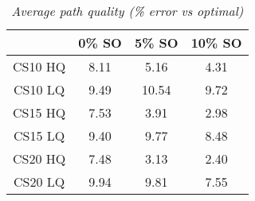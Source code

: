 \begin{table}[ht]
\begin{center}
\caption{\small{\emph{Average path quality (\% error vs optimal)}}}
\label{aha-table:pathquality}
\begin{tabular*}{0.4\textwidth}{@{\extracolsep{\fill}}cccc}%
  \hline
 & \small{0\% SO} & \small{5\% SO} & \small{10\% SO} \\
  \hline
 \small{CS10 HQ} & \small{8.11} & \small{5.16}  & \small{4.31} \\
 \small{CS10 LQ} & \small{9.49} & \small{10.54} & \small{9.72} \\
 \small{CS15 HQ} & \small{7.53} & \small{3.91}  & \small{2.98} \\
 \small{CS15 LQ} & \small{9.40} & \small{9.77}  & \small{8.48} \\
 \small{CS20 HQ} & \small{7.48} & \small{3.13}  & \small{2.40} \\
 \small{CS20 LQ} & \small{9.94} & \small{9.81}  & \small{7.55} \\
   \hline
\end{tabular*}
\end{center}
\end{table}
